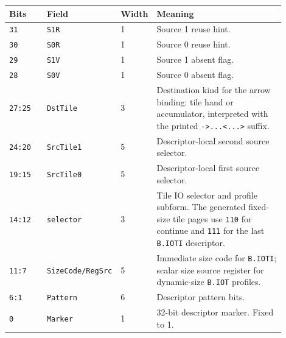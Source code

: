 \begin{longtable}{@{}L{0.14\linewidth}L{0.18\linewidth}R{0.08\linewidth}L{0.50\linewidth}@{}}
\toprule
Bits & Field & Width & Meaning \\
\midrule
\texttt{31} & \texttt{S1R} & 1 & Source 1 reuse hint. \\
\texttt{30} & \texttt{S0R} & 1 & Source 0 reuse hint. \\
\texttt{29} & \texttt{S1V} & 1 & Source 1 absent flag. \\
\texttt{28} & \texttt{S0V} & 1 & Source 0 absent flag. \\
\texttt{27:25} & \texttt{DstTile} & 3 & Destination kind for the arrow binding: tile hand or accumulator, interpreted with the printed \texttt{->...<...>} suffix. \\
\texttt{24:20} & \texttt{SrcTile1} & 5 & Descriptor-local second source selector. \\
\texttt{19:15} & \texttt{SrcTile0} & 5 & Descriptor-local first source selector. \\
\texttt{14:12} & \texttt{selector} & 3 & Tile IO selector and profile subform. The generated fixed-size tile pages use \texttt{110} for continue and \texttt{111} for the last \texttt{B.IOTI} descriptor. \\
\texttt{11:7} & \texttt{SizeCode/RegSrc} & 5 & Immediate size code for \texttt{B.IOTI}; scalar size source register for dynamic-size \texttt{B.IOT} profiles. \\
\texttt{6:1} & \texttt{Pattern} & 6 & Descriptor pattern bits. \\
\texttt{0} & \texttt{Marker} & 1 & 32-bit descriptor marker. Fixed to 1. \\
\bottomrule
\end{longtable}

